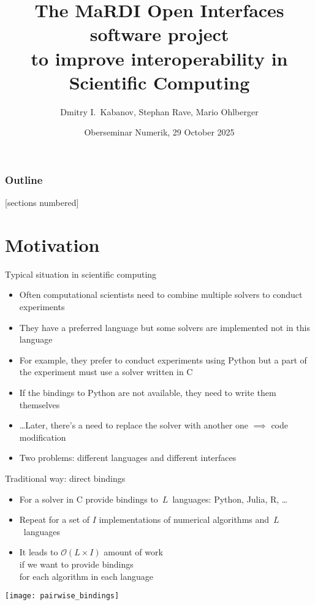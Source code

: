 \documentclass[
  10pt,
  aspectratio=169,
  english,
]{beamer}
\title{%
  The MaRDI Open Interfaces software project\\to improve interoperability in
  Scientific Computing}
\author{Dmitry I.\ Kabanov, Stephan Rave, Mario Ohlberger}
\institute{Mathematics Münster, University of Münster, Germany}
\date{Oberseminar Numerik, 29 October 2025}
\begin{document}
\maketitle

\begin{frame}
  \frametitle{Outline}
  [sections numbered]
  \tableofcontents
\end{frame}

\section{Motivation}

\begin{frame}{Typical situation in scientific computing}
  \begin{itemize}
    \item Often computational scientists need
          to combine multiple solvers to conduct experiments
    \item They have a preferred language but some solvers are implemented
          not in this language
    \item For example, they prefer to conduct experiments using Python
          but a part of the experiment must use a solver written in C
    \item If the bindings to Python are not available, they need to write
          them themselves
    \item \dots Later, there's a need to replace the solver with
          another one $\implies$ code modification
    \item<2-> \alert{Two problems:} different languages and different interfaces
  \end{itemize}
\end{frame}

\begin{frame}{Traditional way: direct bindings}
  \begin{minipage}{0.45\textwidth}
    \begin{itemize}
      \item For a solver in C provide bindings to~$L$~languages: Python, Julia, R, \dots
      \item Repeat for a set of $I$ implementations of numerical algorithms
            and~$L$~languages
      \item It leads to $\mathcal O(L \times I)$ amount of work\\
            if we want to provide bindings\\
            for each algorithm in each language
    \end{itemize}
  \end{minipage}\hfill
  \begin{minipage}{0.45\textwidth}
    \centering
    \texttt{[image: pairwise\_bindings]}
  \end{minipage}
\end{frame}
\end{document}
